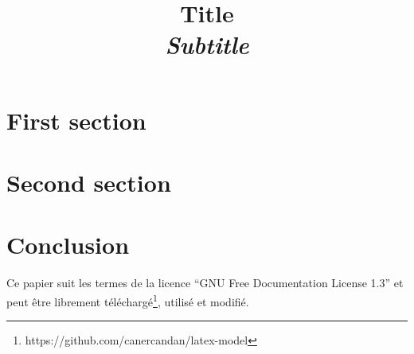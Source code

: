 \documentclass[twocolumn,oneside,10pt]{article}
\title{{\bf Title}\\{\em Subtitle}}
\begin{document}
\maketitle

\begin{abstract}


\end{abstract}

\section{First section}


\section{Second section}


\section{Conclusion}

Ce papier suit les termes de la licence ``GNU Free Documentation License 1.3'' et peut être librement téléchargé\footnote{https://github.com/canercandan/latex-model}, utilisé et modifié.
\end{document}
